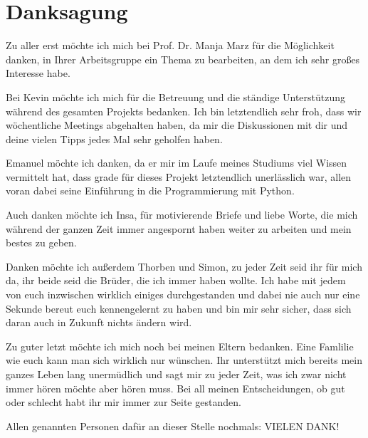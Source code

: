 \chapter*{Danksagung}

Zu aller erst möchte ich mich bei Prof. Dr. Manja Marz für die Möglichkeit danken, in Ihrer Arbeitsgruppe ein Thema zu bearbeiten, an dem ich sehr großes Interesse habe.

\vspace{1em}

Bei Kevin möchte ich mich für die Betreuung und die ständige Unterstützung während des gesamten Projekts bedanken. Ich bin letztendlich sehr froh, dass wir wöchentliche Meetings abgehalten haben, da mir die Diskussionen mit dir und deine vielen Tipps jedes Mal sehr geholfen haben. 

\vspace{1em}

Emanuel möchte ich danken, da er mir im Laufe meines Studiums viel Wissen vermittelt hat, dass grade für dieses Projekt letztendlich unerlässlich war, allen voran dabei seine Einführung in die Programmierung mit Python.



\vspace{1em}

Auch danken möchte ich Insa, für motivierende Briefe und liebe Worte, die mich während der ganzen Zeit immer angespornt haben weiter zu arbeiten und mein bestes zu geben.

\vspace{1em}

Danken möchte ich außerdem Thorben und Simon, zu jeder Zeit seid ihr für mich da, ihr beide seid die Brüder, die ich immer haben wollte. Ich habe mit jedem von euch inzwischen wirklich einiges durchgestanden und dabei nie auch nur eine Sekunde bereut euch kennengelernt zu haben und bin mir sehr sicher, dass sich daran auch in Zukunft nichts ändern wird.

\vspace{1em}

Zu guter letzt möchte ich mich noch bei meinen Eltern bedanken. Eine Famlilie wie euch kann man sich wirklich nur wünschen. Ihr unterstützt mich bereits mein ganzes Leben lang unermüdlich und sagt mir zu jeder Zeit, was ich zwar nicht immer hören möchte aber hören muss. Bei all meinen Entscheidungen, ob gut oder schlecht habt ihr mir immer zur Seite gestanden. 

\vspace{1em}

Allen genannten Personen dafür an dieser Stelle nochmals: VIELEN DANK!